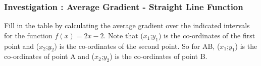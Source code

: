             \subsubsection{  Investigation : Average Gradient - Straight Line Function }
            \nopagebreak
      \label{m39213*id189861}Fill in the table by calculating the average gradient over the indicated
intervals for the function $f\left(x\right)=2x-2$. Note that (\begin{math}{x}_{1}\end{math};\begin{math}{y}_{1}\end{math}) is the co-ordinates of the first point and (\begin{math}{x}_{2}\end{math};\begin{math}{y}_{2}\end{math}) is the co-ordinates of the second point. So for AB, (\begin{math}{x}_{1}\end{math};\begin{math}{y}_{1}\end{math}) is the co-ordinates of point A and (\begin{math}{x}_{2}\end{math};\begin{math}{y}_{2}\end{math}) is the co-ordinates of point B.\par 
      \label{m39213*id189893}
